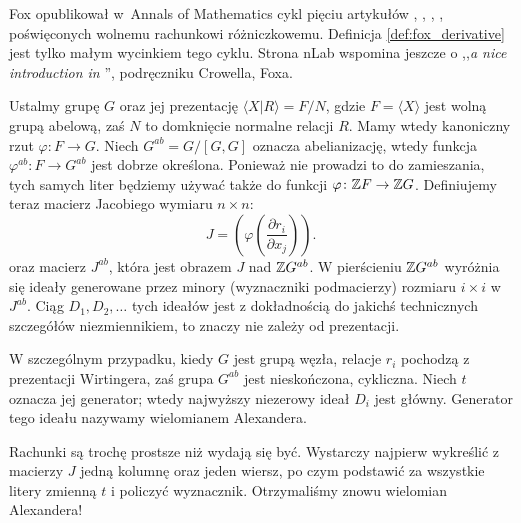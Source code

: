 Fox opublikował w~Annals of Mathematics cykl pięciu artykułów \cite{fox53}, \cite{fox54}, \cite{fox56}, \cite{fox58}, \cite{fox60} poświęconych wolnemu rachunkowi różniczkowemu.
%
Definicja \ref{def:fox_derivative} jest tylko małym wycinkiem tego cyklu.
Strona nLab wspomina jeszcze o ,,\emph{a nice introduction in} \cite{crowell63}'', podręczniku Crowella, Foxa.


Ustalmy grupę $G$ oraz jej prezentację $\langle X | R \rangle = F/N$, gdzie $F = \langle X \rangle$ jest wolną grupą abelową, zaś $N$ to domknięcie normalne relacji $R$.
Mamy wtedy kanoniczny rzut $\varphi \colon F \to G$.
Niech $G^{ab} = G/[G, G]$ oznacza abelianizację, wtedy funkcja $\varphi^{ab} \colon F \to G^{ab}$ jest dobrze określona.
Ponieważ nie prowadzi to do zamieszania, tych samych liter będziemy używać także do funkcji $\varphi \colon \mathbb Z F \to \mathbb Z G$.
Definiujemy teraz macierz Jacobiego wymiaru $n \times n$:
%
\begin{equation}
    J = \left(\varphi \left(\frac{\partial r_i}{\partial x_j}\right) \right).
\end{equation}
oraz macierz $J^{ab}$, która jest obrazem $J$ nad $\mathbb Z G^{ab}$.
W pierścieniu $\mathbb Z G^{ab}$ wyróżnia się ideały generowane przez minory (wyznaczniki podmacierzy) rozmiaru $i \times i$ w $J^{ab}$.
Ciąg $D_1, D_2, \ldots$ tych ideałów jest z dokładnością do jakichś technicznych szczegółów niezmiennikiem, to znaczy nie zależy od prezentacji.

W szczególnym przypadku, kiedy $G$ jest grupą węzła, relacje $r_i$ pochodzą z prezentacji Wirtingera, zaś grupa $G^{ab}$ jest nieskończona, cykliczna.
Niech $t$ oznacza jej generator; wtedy najwyższy niezerowy ideał $D_i$ jest główny.
Generator tego ideału nazywamy wielomianem Alexandera.
%

Rachunki są trochę prostsze niż wydają się być.
Wystarczy najpierw wykreślić z macierzy $J$ jedną kolumnę oraz jeden wiersz, po czym podstawić za wszystkie litery zmienną $t$ i policzyć wyznacznik.
Otrzymaliśmy znowu wielomian Alexandera!

%

